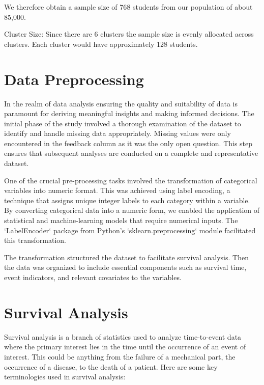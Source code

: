 \documentclass[12pt]{report}
\begin{document}
We therefore obtain a sample size of 768 students from our population of about 85,000.

Cluster Size:
Since there are 6 clusters the sample size is evenly allocated across clusters. Each cluster would have approximately 128 students.

\section{Data Preprocessing}
In the realm of data analysis ensuring the quality and suitability of data is paramount for deriving meaningful insights and making informed decisions. The initial phase of the study involved a thorough examination of the dataset to identify and handle missing data appropriately. Missing values were only encountered in the feedback column as it was the only open question. This step ensures that subsequent analyses are conducted on a complete and representative dataset.

One of the crucial pre-processing tasks involved the transformation of categorical variables into numeric format. This was achieved using label encoding, a technique that assigns unique integer labels to each category within a variable. By converting categorical data into a numeric form, we enabled the application of statistical and machine-learning models that require numerical inputs. The `LabelEncoder` package from Python's `sklearn.preprocessing` module facilitated this transformation.

The transformation structured the dataset to facilitate survival analysis. Then the data was organized to include essential components such as survival time, event indicators, and relevant covariates to the variables.

\section{Survival Analysis}
Survival analysis is a branch of statistics used to analyze time-to-event data where the primary interest lies in the time until the occurrence of an event of interest. This could be anything from the failure of a mechanical part, the occurrence of a disease, to the death of a patient. Here are some key terminologies used in survival analysis:
\end{document}
